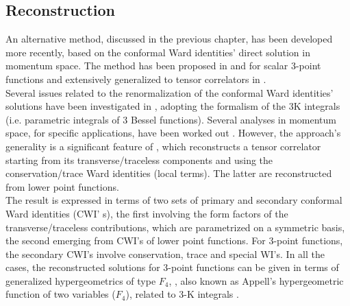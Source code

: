 \documentclass[a4paper,11pt,openright,twoside]{book}
\numberwithin{equation}{section}
\begin{document}
{{\subsection{Reconstruction}
An alternative method, discussed in the previous chapter, has been developed more recently,  based on the conformal Ward identities' direct solution in momentum space. The method has been proposed in \cite{Bzowski:2013sza} and \cite{Coriano:2013jba} for scalar 3-point functions and extensively generalized to tensor correlators in \cite{Bzowski:2013sza}.\\
Several issues related to the renormalization of the conformal Ward identities' solutions have been investigated in \cite{Bzowski:2015yxv, Bzowski:2017poo}, adopting the formalism of the 3K integrals (i.e. parametric integrals of 3 Bessel functions). 
Several analyses in momentum space, for specific applications, have been worked out \cite{Coriano:2012hd, Bzowski:2011ab}. However, the approach's generality is a significant feature of \cite{Bzowski:2013sza}, which reconstructs a tensor correlator starting from its transverse/traceless components and using the conservation/trace Ward identities (local terms). The latter are reconstructed from lower point functions.\\
The result is expressed in terms of two sets of primary and secondary conformal Ward identities (CWI' s), the first involving the form factors of the transverse/traceless contributions, which are parametrized on a symmetric basis, the second emerging from CWI's of lower point functions. For 3-point functions, the secondary CWI's involve conservation, trace and special WI's. In all the cases, the reconstructed solutions for 3-point functions can be given in terms of generalized hypergeometrics of type $F_4$, \cite{Coriano:2012wp}, also known as Appell's hypergeometric function of two variables ($F_4$), related to 3-K integrals \cite{Bzowski:2013sza}. 
}}
\end{document}
